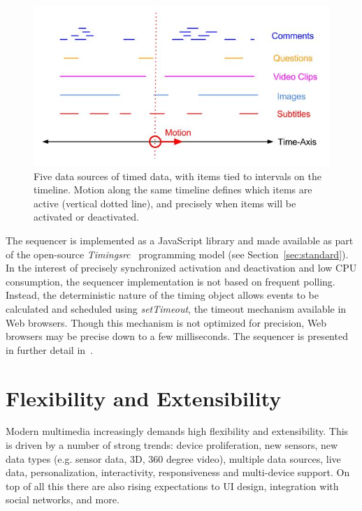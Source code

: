 \documentclass[graybox]{svmult}
\begin{document}
\begin{figure}[h]
\centering
\includegraphics[scale=.4]{fig/sequencer.jpg}
\caption{Five data sources of timed data, with items tied to intervals on the timeline. Motion along the same timeline defines which items are active (vertical dotted line), and precisely when items will be activated or deactivated.}
\label{fig:sequencer}
\end{figure}


The sequencer is implemented as a JavaScript library and made available as
part of the open-source \emph{Timingsrc}~\cite{timingsrc} programming model
(see Section~\ref{sec:standard}). In the interest of precisely synchronized
activation and deactivation and low CPU consumption, the sequencer
implementation is not based on frequent polling. Instead, the deterministic
nature of the timing object allows events to be calculated and scheduled using
\emph{setTimeout}, the timeout mechanism available in Web browsers. Though
this mechanism is not optimized for precision, Web browsers may be precise
down to a few milliseconds. The sequencer is presented in further detail in~\cite{sequencer}.


\section{Flexibility and Extensibility}
\label{sec:flexibility}
Modern multimedia increasingly demands high flexibility and extensibility.
This is driven by a number of strong trends: device proliferation, new
sensors, new data types (e.g. sensor data, 3D, 360 degree video), multiple data
sources, live data, personalization, interactivity, responsiveness and multi-device 
support. On top of all this there are also rising expectations to UI
design, integration with social networks, and more.
\end{document}
